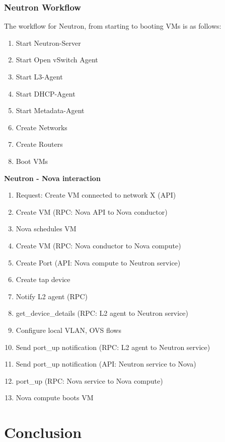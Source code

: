 \subsubsection{Neutron Workflow}

The workflow for Neutron, from starting to booting VMs is as follows:
\begin{enumerate}
\item Start Neutron-Server
\item Start Open vSwitch Agent
\item Start L3-Agent
\item Start DHCP-Agent
\item Start Metadata-Agent
\item Create Networks
\item Create Routers
\item Boot VMs
\end{enumerate}


\textbf{Neutron - Nova interaction}

\begin{enumerate}
\item Request: Create VM connected to network X (API)
\item Create VM (RPC: Nova API to Nova conductor)
\item Nova schedules VM
\item Create VM (RPC: Nova conductor to Nova compute)
\item Create Port (API: Nova compute to Neutron service)
\item Create tap device
\item Notify L2 agent (RPC)
\item get\_device\_details (RPC: L2 agent to Neutron service)
\item Configure local VLAN, OVS flows
\item Send port\_up notification (RPC: L2 agent to Neutron service)
\item Send port\_up notification (API: Neutron service to Nova)
\item port\_up (RPC: Nova service to Nova compute)
\item Nova compute boots VM

\end{enumerate}


\section{Conclusion}